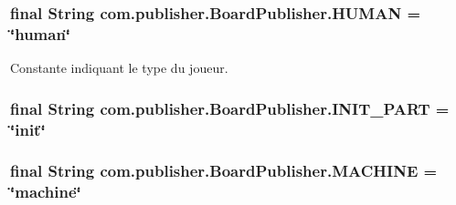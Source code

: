 \hypertarget{interfacecom_1_1publisher_1_1BoardPublisher_aa1f69b7f88b84c429507c8e1a1a05dfc}{
\subsubsection[{H\-U\-M\-A\-N}]{\setlength{\rightskip}{0pt plus 5cm}final String com.\-publisher.\-Board\-Publisher.\-H\-U\-M\-A\-N = \char`\"{}human\char`\"{}\hspace{0.3cm}{\ttfamily [static]}}}\label{interfacecom_1_1publisher_1_1BoardPublisher_aa1f69b7f88b84c429507c8e1a1a05dfc}
Constante indiquant le type du joueur. \hypertarget{interfacecom_1_1publisher_1_1BoardPublisher_a4284ddedaea2e3e014c275c71b630151}{
\subsubsection[{I\-N\-I\-T\-\_\-\-P\-A\-R\-T}]{\setlength{\rightskip}{0pt plus 5cm}final String com.\-publisher.\-Board\-Publisher.\-I\-N\-I\-T\-\_\-\-P\-A\-R\-T = \char`\"{}init\char`\"{}\hspace{0.3cm}{\ttfamily [static]}}}\label{interfacecom_1_1publisher_1_1BoardPublisher_a4284ddedaea2e3e014c275c71b630151}
\hypertarget{interfacecom_1_1publisher_1_1BoardPublisher_a129aef59c73a473f569518604209f9a5}{
\subsubsection[{M\-A\-C\-H\-I\-N\-E}]{\setlength{\rightskip}{0pt plus 5cm}final String com.\-publisher.\-Board\-Publisher.\-M\-A\-C\-H\-I\-N\-E = \char`\"{}machine\char`\"{}\hspace{0.3cm}{\ttfamily [static]}}}\label{interfacecom_1_1publisher_1_1BoardPublisher_a129aef59c73a473f569518604209f9a5}
